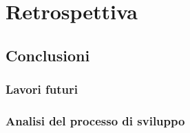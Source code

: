 \documentclass{book}
\begin{document}
\chapter{Retrospettiva}


\section{Conclusioni}


\subsection{Lavori futuri}


\subsection{Analisi del processo di sviluppo}



\nocite{*} %


\end{document}
